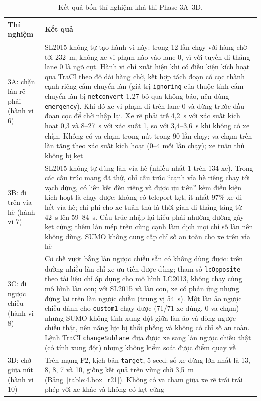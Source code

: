 \documentclass[../main.tex]{subfiles}
\begin{document}
\begin{table}[H]
\centering
\small
\caption{Kết quả bốn thí nghiệm khả thi Phase 3A--3D.} \label{table:4.phase3}
\begin{tabular}{|p{2.4cm}|p{11.6cm}|}
\hline
\textbf{Thí nghiệm} & \textbf{Kết quả} \\ \hline
3A: chặn làn rẽ phải (hành vi 6) & SL2015 không tự tạo hành vi này: trong 12 lần chạy với hàng chờ tới 232~m, không xe vi phạm nào vào lane 0, vì với tuyến đi thẳng lane 0 là ngõ cụt. Hành vi chỉ xuất hiện khi có điều kiện kích hoạt qua TraCI theo độ dài hàng chờ, kết hợp tách đoạn có cọc thành cạnh riêng cấm chuyển làn (giá trị \texttt{ignoring} của thuộc tính cấm chuyển làn bị \texttt{netconvert} 1.27 bỏ qua không báo, nên dùng \texttt{emergency}). Khi đó xe vi phạm đi trên lane 0 và dừng trước đầu đoạn cọc để chờ nhập lại. Xe rẽ phải trễ 4,2~s với xác suất kích hoạt 0,3 và 8--27~s với xác suất 1, so với 3,4--3,6~s khi không có xe chặn. Không có va chạm trong nút trong 90 lần chạy; va chạm trên làn tăng theo xác suất kích hoạt (0--4 mỗi lần chạy); xe tuân thủ không bị kẹt \\ \hline
3B: đi trên vỉa hè (hành vi 7) & SL2015 không tự dùng làn vỉa hè (nhiều nhất 1 trên 134 xe). Trong các cấu trúc mạng đã thử, chỉ cấu trúc ``cạnh vỉa hè riêng chạy tới vạch dừng, có liên kết đèn riêng và được ưu tiên'' kèm điều kiện kích hoạt là chạy được: không có teleport kẹt, ít nhất 97\% xe đi hết vỉa hè; chi phí cho xe tuân thủ là thời gian đi thẳng tăng từ 42~s lên 59--84~s. Cấu trúc nhập lại kiểu phải nhường đường gây kẹt cứng; thêm làn mép trên cùng cạnh làm dịch mọi chỉ số làn nên không dùng. SUMO không cung cấp chỉ số an toàn cho xe trên vỉa hè \\ \hline
3C: đi ngược chiều (hành vi 8) & Cơ chế vượt bằng làn ngược chiều sẵn có không dùng được: trên đường nhiều làn chỉ xe ưu tiên được dùng; tham số \texttt{lcOpposite} theo tài liệu chỉ áp dụng cho mô hình LC2013, không chạy cùng mô hình làn con; với SL2015 và làn con, xe có phản ứng nhưng đứng lại trên làn ngược chiều (trung vị 54~s). Một làn ảo ngược chiều dành cho \texttt{custom1} chạy được (71/71 xe dùng, 0 va chạm) nhưng SUMO không tính xung đột giữa làn ảo và dòng ngược chiều thật, nên năng lực bị thổi phồng và không có chỉ số an toàn. Lệnh TraCI \texttt{changeSublane} đưa được xe sang làn ngược chiều thật (có tính xung đột) nhưng không kiểm soát được điểm quay về \\ \hline
3D: chờ giữa nút (hành vi 10) & Trên mạng F2, kịch bản \texttt{target}, 5 seed: số xe dừng lớn nhất là 13, 8, 8, 7 và 10, giống kết quả trên vùng chờ 3,5~m (Bảng~\ref{table:4.box_r21}). Không có va chạm giữa xe rẽ trái trái phép với xe khác và không có kẹt cứng \\ \hline
\end{tabular}
\end{table}
\end{document}
